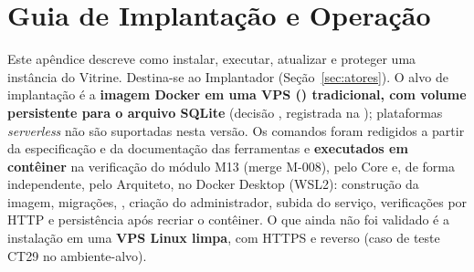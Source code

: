 \chapter{Guia de Implantação e Operação}\label{ap:implantacao}

Este apêndice descreve como instalar, executar, atualizar e proteger uma instância do Vitrine. Destina-se ao Implantador (Seção~\ref{sec:atores}). O alvo de implantação é a \textbf{imagem Docker em uma VPS () tradicional, com volume persistente para o arquivo SQLite} (decisão , registrada na ); plataformas \emph{serverless} não são suportadas nesta versão. Os comandos foram redigidos a partir da especificação e da documentação das ferramentas \cite{dockerdocs} e \textbf{executados em contêiner} na verificação do módulo M13 (merge M-008), pelo Core e, de forma independente, pelo Arquiteto, no Docker Desktop (WSL2): construção da imagem, migrações, , criação do administrador, subida do serviço, verificações por HTTP e persistência após recriar o contêiner. O que ainda não foi validado é a instalação em uma \textbf{VPS Linux limpa}, com HTTPS e  reverso (caso de teste CT29 no ambiente-alvo).


